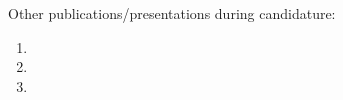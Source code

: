 \newpage

Other publications/presentations during candidature:
\begin{enumerate}
	\item {}
  \item {}
  \item {}
\end{enumerate}

\singlespacing

\tableofcontents
\newpage


%
